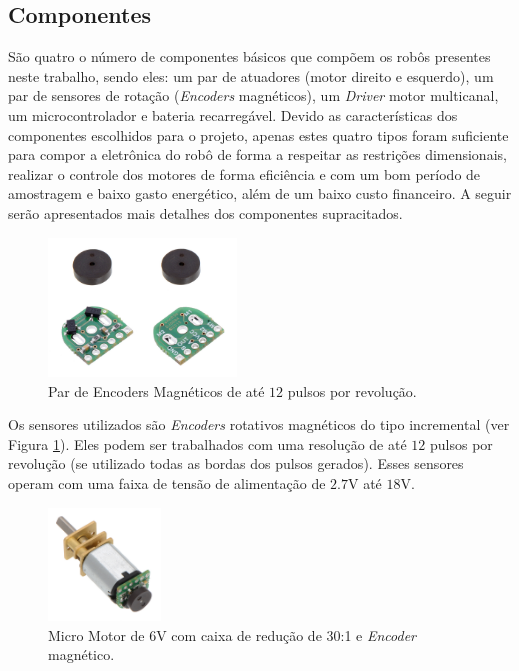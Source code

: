 \subsection{Componentes}
\label{subsec:componentes}

São quatro o número de componentes básicos que compõem os robôs presentes neste trabalho, sendo eles: um par de atuadores (motor direito e esquerdo), um par de sensores de rotação (\textit{Encoders} magnéticos), um \emph{Driver} motor multicanal, um microcontrolador e bateria recarregável. Devido as características dos componentes escolhidos para o projeto, apenas estes quatro tipos foram suficiente para compor a eletrônica do robô de forma a respeitar as restrições dimensionais, realizar o controle dos motores de forma eficiência e com um bom período de amostragem e baixo gasto energético, além de um baixo custo financeiro. A seguir serão apresentados mais detalhes dos componentes supracitados.\\

\begin{figure}[H]
    \centering
    \includegraphics[width=5cm]{figuras/eletronica/encoder_frente_verso.jpg}
    \caption{Par de Encoders Magnéticos de até $12$ pulsos por revolução.}
    \label{fig:encoder}
\end{figure}

Os sensores utilizados são \emph{Encoders} rotativos magnéticos do tipo incremental (ver Figura \ref{fig:encoder}). Eles podem ser trabalhados com uma resolução de até $12$ pulsos por revolução (se utilizado todas as bordas dos pulsos gerados). Esses sensores operam com uma faixa de tensão de alimentação de $2.7$V até $18$V.\\

\begin{figure}[H]
    \centering
    \includegraphics[width=3cm]{figuras/eletronica/motor_com_encoder.jpg}
    \caption{Micro Motor de 6V com caixa de redução de 30:1 e \textit{Encoder} magnético.}
    \label{fig:motor_com_encoder}
\end{figure}


